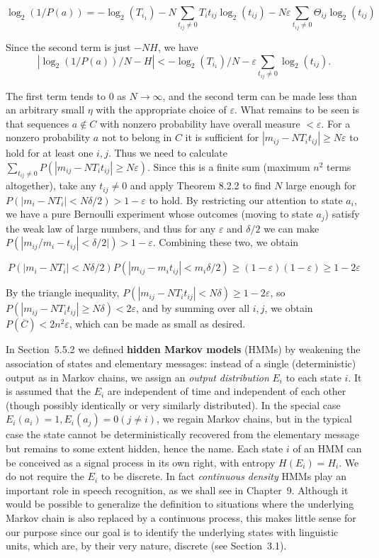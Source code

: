 \begin{equation}
\log_2(1/P(a)) = -\log_2(T_{i_1})-N \sum_{t_{ij}\neq 0}T_it_{ij}\log_2(t_{ij})-N 
\varepsilon \sum_{t_{ij}\neq 0} \Theta_{ij}\log_2(t_{ij}) 
\end{equation}

\noindent Since the second term is just $-NH$, we have $$|\log_2(1/P(a))/N-H|
< -\log_2(T_{i_1})/N - \varepsilon\sum_{t_{ij}\neq 0}\log_2(t_{ij}).$$

\smallskip\noindent The first term tends to 0 as $N\rightarrow\infty$, and the
second term can be made less than an arbitrary small $\eta$ with the
appropriate choice of $\varepsilon$. What remains to be seen is that sequences
$a\not\in C$ with nonzero probability have overall measure $<\varepsilon$. For
a nonzero probability $a$ not to belong in $C$ it is sufficient for $|m_{ij}
-NT_it_{ij}| \geq N\varepsilon$ to hold for at least one $i,j$. Thus we need
to calculate $\sum_{t_{ij}\neq 0} P(|m_{ij}-NT_it_{ij}|\geq N
\varepsilon)$. Since this is a finite sum (maximum $n^2$ terms altogether),
take any $t_{ij}\neq 0$ and apply Theorem 8.2.2 to find $N$ large enough for
$P(|m_i-NT_i|<N\delta/2)>1-\varepsilon$ to hold. By restricting our attention
to state $a_i$, we have a pure Bernoulli experiment whose outcomes (moving to
state $a_j$) satisfy the weak law of large numbers, and thus for any
$\varepsilon$ and $\delta/2$ we can make
$P(|m_{ij}/m_i-t_{ij}|<\delta/2|)>1-\varepsilon$. Combining these two, we
obtain

$$P(|m_i-NT_i|<N\delta/2) P(|m_{ij}-m_it_{ij}|<m_i\delta/2) \geq
(1-\varepsilon)(1-\varepsilon)\geq 1-2\varepsilon$$

\noindent By the triangle inequality, $P(|m_{ij}-NT_it_{ij}|<N\delta) \geq
1-2\varepsilon$, so $P(|m_{ij}-NT_it_{ij}|\geq N\delta) <2\varepsilon$, and by
summing over all $i,j$, we obtain $P(\overline{C}) < 2n^2\varepsilon$, which
can be made as small as desired.

\smallskip\noindent In Section~5.5.2 we defined {\bf hidden Markov models}
(HMMs) by weakening the association of states and elementary messages: instead
of a single (deterministic) output as in Markov chains, we assign an {\it
  output distribution} $E_i$ to each state $i$. It is assumed that the $E_i$
are independent of time and independent of each other (though possibly
identically or very similarly distributed). In the special case $E_i(a_i)=1,
E_i(a_j) =0 (j\neq i)$, we regain Markov chains, but in the typical case the
state cannot be deterministically recovered from the elementary message but
remains to some extent hidden, hence the name. Each state $i$ of an HMM can be
conceived as a signal process in its
own right, with entropy $H(E_i)=H_i$. We do not require the $E_i$ to be
discrete. In fact {\it continuous density} HMMs  play an important role in speech recognition, as we
shall see in Chapter~9.  Although it would be possible to generalize the
definition to situations where the underlying Markov chain is also replaced by
a continuous process, this makes little sense for our purpose since our goal
is to identify the underlying states with linguistic units, which are, by
their very nature, discrete (see Section~3.1).

